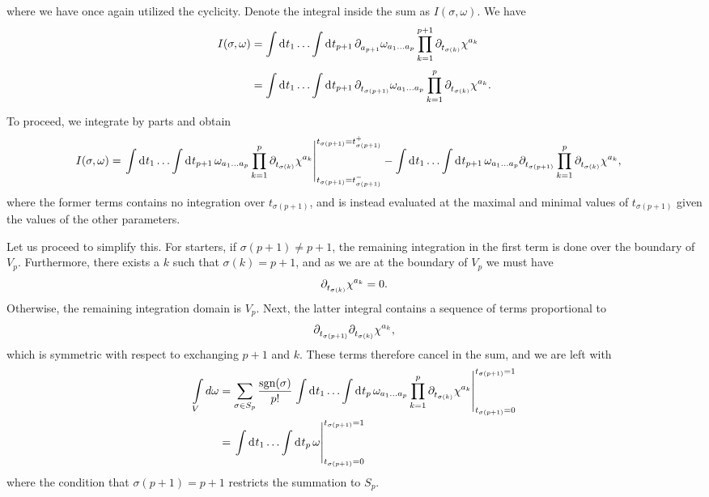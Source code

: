 where we have once again utilized the cyclicity. Denote the integral inside the sum as $I(\sigma, \omega)$. We have
\begin{align*}
	I(\sigma, \omega) &= \integ{}{}{t_{1}}{\dots \integ{}{}{t_{p + 1}}{\del{a_{p + 1}}{\omega_{a_{1}\dots a_{p}}}\prod\limits_{k = 1}^{p + 1}\del{t_{\sigma(k)}}{\chi^{a_{k}}}}} \\
	                  &= \integ{}{}{t_{1}}{\dots \integ{}{}{t_{p + 1}}{\del{t_{\sigma(p + 1)}}{\omega_{a_{1}\dots a_{p}}}\prod\limits_{k = 1}^{p}\del{t_{\sigma(k)}}{\chi^{a_{k}}}}}.
\end{align*}
To proceed, we integrate by parts and obtain
\begin{align*}
	I(\sigma, \omega) &= \eval{\integ{}{}{t_{1}}{\dots \integ{}{}{t_{p + 1}}{\omega_{a_{1}\dots a_{p}}\prod\limits_{k = 1}^{p}\del{t_{\sigma(k)}}{\chi^{a_{k}}}}}}_{t_{\sigma(p + 1)} = t_{\sigma(p + 1)}^{-}}^{t_{\sigma(p + 1)} = t_{\sigma(p + 1)}^{+}} - \integ{}{}{t_{1}}{\dots \integ{}{}{t_{p + 1}}{\omega_{a_{1}\dots a_{p}}\del{t_{\sigma(p + 1)}}{\prod\limits_{k = 1}^{p}\del{t_{\sigma(k)}}{\chi^{a_{k}}}}}},
\end{align*}
where the former terms contains no integration over $t_{\sigma(p + 1)}$, and is instead evaluated at the maximal and minimal values of $t_{\sigma(p + 1)}$ given the values of the other parameters.

Let us proceed to simplify this. For starters, if $\sigma(p + 1) \neq p + 1$, the remaining integration in the first term is done over the boundary of $V_{p}$. Furthermore, there exists a $k$ such that $\sigma(k) = p + 1$, and as we are at the boundary of $V_{p}$ we must have
\begin{align*}
	\partial^{}_{t_{\sigma(k)}}\chi^{a_{k}} = 0.
\end{align*}
Otherwise, the remaining integration domain is $V_{p}$. Next, the latter integral contains a sequence of terms proportional to
\begin{align*}
	\partial^{}_{t_{\sigma(p + 1)}}\partial^{}_{t_{\sigma(k)}}\chi^{a_{k}},
\end{align*}
which is symmetric with respect to exchanging $p + 1$ and $k$. These terms therefore cancel in the sum, and we are left with
\begin{align*}
	\minteg{V}{d\omega} &= \sum\limits_{\sigma\in S_{p}}\frac{\text{sgn}(\sigma)}{p!}\eval{\integ{}{}{t_{1}}{\dots \integ{}{}{t_{p}}{\omega_{a_{1}\dots a_{p}}\prod\limits_{k = 1}^{p}\del{t_{\sigma(k)}}{\chi^{a_{k}}}}}}_{t_{\sigma(p + 1)} = 0}^{t_{\sigma(p + 1)} = 1} \\
	                    &= \eval{\integ{}{}{t_{1}}{\dots \integ{}{}{t_{p}}{\omega}}}_{t_{\sigma(p + 1)} = 0}^{t_{\sigma(p + 1)} = 1}
\end{align*}
where the condition that $\sigma(p + 1) = p + 1$ restricts the summation to $S_{p}$.

